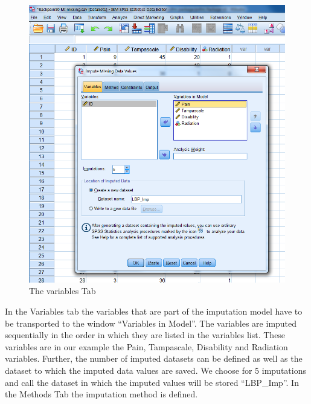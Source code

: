 \documentclass[]{book}
\theoremstyle{definition}
\theoremstyle{definition}
\theoremstyle{definition}
\theoremstyle{remark}
\begin{document}
\begin{figure}

{\centering \includegraphics[width=0.9\linewidth]{images/fig4.6} 

}

\caption{The variables Tab}\label{fig:fig4-6}
\end{figure}

In the Variables tab the variables that are part of the imputation model
have to be transported to the window ``Variables in Model''. The
variables are imputed sequentially in the order in which they are listed
in the variables list. These variables are in our example the Pain,
Tampascale, Disability and Radiation variables. Further, the number of
imputed datasets can be defined as well as the dataset to which the
imputed data values are saved. We choose for 5 imputations and call the
dataset in which the imputed values will be stored ``LBP\_Imp''. In the
Methods Tab the imputation method is defined.
\end{document}

